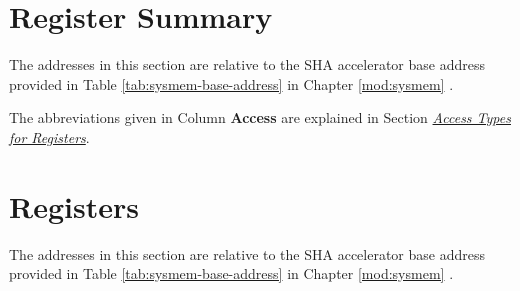 \documentclass[main\_\_EN.tex]{subfiles}
\begin{document}
\section{Register Summary} \label{sec:sha-reg-summ} \hypertarget{sha-reg-summ}{}

The addresses in this section are relative to the SHA accelerator base address provided in Table \ref{tab:sysmem-base-address} in Chapter \ref{mod:sysmem} \textit{}.

The abbreviations given in Column \textbf{Access} are explained in Section \hyperref[glossary-access-types]{\textit{Access Types for Registers}}.



\section{Registers}

The addresses in this section are relative to the SHA accelerator base address provided in Table \ref{tab:sysmem-base-address} in Chapter \ref{mod:sysmem} \textit{}.


\end{document}

